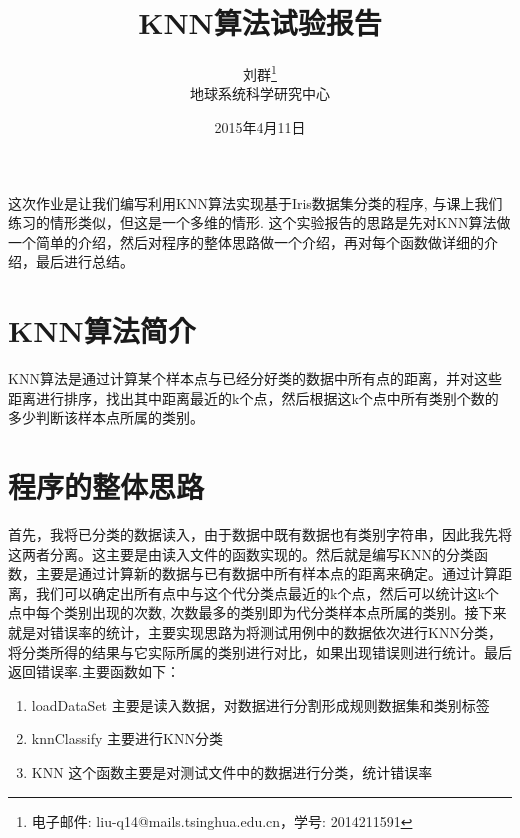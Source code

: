 \documentclass[a4paper, 1pt]{article}
\newcommand{\xiaosihao}{\fontsize{12pt}{\baselineskip}\selectfont}
\newcommand{\wuhao}{\fontsize{10.5pt}{\baselineskip}\selectfont}
\newcommand{\xiaowuhao}{\fontsize{9pt}{\baselineskip}\selectfont}
\begin{document}
\begin{spacing}{1.0}

\title{KNN算法试验报告}
\author{\wuhao 刘群\footnote{电子邮件: liu-q14@mails.tsinghua.edu.cn，学号: 2014211591}\\[2ex]
\wuhao 地球系统科学研究中心\\
}
\date{\wuhao 2015年4月11日}
\maketitle

\xiaowuhao 这次作业是让我们编写利用KNN算法实现基于Iris数据集分类的程序, 与课上我们练习的情形类似，但这是一个多维的情形. 这个实验报告的思路是先对KNN算法做一个简单的介绍，然后对程序的整体思路做一个介绍，再对每个函数做详细的介绍，最后进行总结。
\section{\xiaosihao KNN算法简介}
KNN算法是通过计算某个样本点与已经分好类的数据中所有点的距离，并对这些距离进行排序，找出其中距离最近的k个点，然后根据这k个点中所有类别个数的多少判断该样本点所属的类别。
\section{\xiaosihao 程序的整体思路}
首先，我将已分类的数据读入，由于数据中既有数据也有类别字符串，因此我先将这两者分离。这主要是由读入文件的函数实现的。然后就是编写KNN的分类函数，主要是通过计算新的数据与已有数据中所有样本点的距离来确定。通过计算距离，我们可以确定出所有点中与这个代分类点最近的k个点，然后可以统计这k个点中每个类别出现的次数, 次数最多的类别即为代分类样本点所属的类别。接下来就是对错误率的统计，主要实现思路为将测试用例中的数据依次进行KNN分类，将分类所得的结果与它实际所属的类别进行对比，如果出现错误则进行统计。最后返回错误率.主要函数如下：
\begin{enumerate}\setlength{\itemsep}{-2pt}
\item loadDataSet 主要是读入数据，对数据进行分割形成规则数据集和类别标签  
\item knnClassify 主要进行KNN分类 
\item KNN 这个函数主要是对测试文件中的数据进行分类，统计错误率 
\end{enumerate}



\end{spacing}
\end{document}
